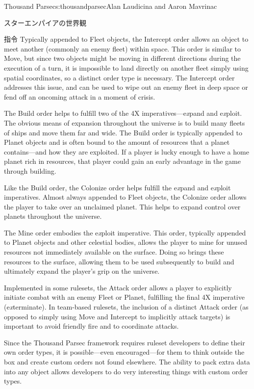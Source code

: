 \begin{aosachapter}{Thousand Parsec}{s:thousandparsec}{Alan Laudicina and Aaron Mavrinac}
\begin{aosasect1}{スターエンパイアの世界観}
\begin{aosasect2}{指令}
Typically appended to Fleet objects, the Intercept order allows an
object to meet another (commonly an enemy fleet) within space. This
order is similar to Move, but since two objects might be moving in
different directions during the execution of a turn, it is impossible
to land directly on another fleet simply using spatial coordinates, so
a distinct order type is necessary. The Intercept order addresses this
issue, and can be used to wipe out an enemy fleet in deep space or
fend off an oncoming attack in a moment of crisis.

The Build order helps to fulfill two of the 4X
imperatives---e\emph{x}pand and e\emph{x}ploit. The obvious means of
expansion throughout the universe is to build many fleets of ships and
move them far and wide. The Build order is typically appended to
Planet objects and is often bound to the amount of resources that a
planet contains---and how they are exploited. If a player is lucky
enough to have a home planet rich in resources, that player could gain
an early advantage in the game through building.

Like the Build order, the Colonize order helps fulfill the
e\emph{x}pand and e\emph{x}ploit imperatives. Almost always appended
to Fleet objects, the Colonize order allows the player to take over an
unclaimed planet. This helps to expand control over planets throughout
the universe.

The Mine order embodies the e\emph{x}ploit imperative. This order,
typically appended to Planet objects and other celestial bodies,
allows the player to mine for unused resources not immediately
available on the surface. Doing so brings these resources to the
surface, allowing them to be used subsequently to build and ultimately
expand the player's grip on the universe.

Implemented in some rulesets, the Attack order allows a player to
explicitly initiate combat with an enemy Fleet or Planet, fulfilling
the final 4X imperative (e\emph{x}terminate). In team-based rulesets,
the inclusion of a distinct Attack order (as opposed to simply using
Move and Intercept to implicitly attack targets) is important to avoid
friendly fire and to coordinate attacks.

Since the Thousand Parsec framework requires ruleset developers to
define their own order types, it is possible---even encouraged---for
them to think outside the box and create custom orders not found
elsewhere. The ability to pack extra data into any object allows
developers to do very interesting things with custom order types.


\end{aosasect2}
\end{aosasect1}
\end{aosachapter}
